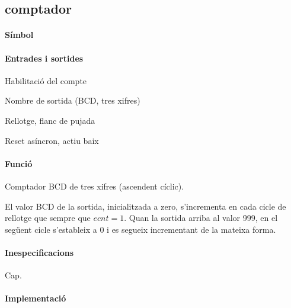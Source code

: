 \subsection{\label{sub:\projectname-comptador} \textsf{comptador}}

\paragraph{Símbol}

\begin{center}  \end{center}

\paragraph{Entrades i sortides}

\begin{where}
\item[\nodenamebit{ecnt}] Habilitació del compte
\item[\nodenamerange{numx}{11}{0}] Nombre de sortida (BCD, tres xifres)
\item[\nodenamebit{clk}] Rellotge, flanc de pujada
\item[\nodenamebit{nrst}] Reset asíncron, actiu baix
\end{where}

\paragraph{Funció}

Comptador BCD de tres xifres (ascendent cíclic).

El valor BCD de la sortida, inicialitzada a zero, s'incrementa en cada cicle de rellotge que sempre que $ecnt = 1$.
Quan la sortida arriba al valor 999, en el següent cicle s'estableix a 0 i es segueix incrementant de la mateixa forma.

\paragraph{Inespecificacions}

Cap.

\paragraph{Implementació}




